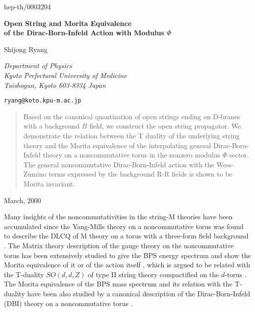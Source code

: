 \documentclass[12pt,a4paper]{article}
\begin{document}
\begin{flushright}
hep-th/0003204
\end{flushright}
\vspace{1.8cm}

\begin{center}
\textbf{\Large Open String and Morita Equivalence \\
of the Dirac-Born-Infeld Action with Modulus $\Phi$}
\end{center}
\vspace{1.6cm}
\begin{center}
 Shijong Ryang
\end{center}

\begin{center}
\textit{Department of Physics \\ Kyoto Prefectural University of Medicine
\\ Taishogun, Kyoto 603-8334 Japan}
\par
\texttt{ryang@koto.kpu-m.ac.jp}
\end{center}
\vspace{2.8cm}
\begin{abstract}
Based on the canonical quantization of open strings ending on D-branes
with a background $B$ field, we construct the open string propagator.
We demonstrate the relation between the T duality of the
underlying string theory and the Morita equivalence of the 
interpolating general Dirac-Born-Infeld theory on a noncommutative torus
in the nonzero modulus $\Phi$ sector. The general noncommutative 
Dirac-Born-Infeld action with the Wess-Zumino terms expressed by the 
background R-R fields is shown to be Morita invariant.
\end{abstract}
\vspace{3cm}
\begin{flushleft}
March, 2000
\end{flushleft}
\newpage
Many insights of the noncommutativities in the string-M theories have 
been accumulated since the Yang-Mills theory on a noncommutative torus was
found to describe the DLCQ of M theory on a torus with a three-form field
background  \cite{CDS}. The Matrix theory description of the gauge 
theory on the noncommutative torus has been extensively studied 
\cite{NCY} to give the BPS energy spectrum and show the Morita 
equivalence of it \cite{PH,BM,KS} or of the action itself \cite{AS,BMZ},
which is argued to be related with the T-duality $SO(d,d,Z)$ of type II 
string theory compactified on the $d$-torus \cite{BMZ,PS}. The Morita 
equivalence of the BPS mass spectrum and its relation with the T-duality
have been also studied by a canonical description of the Dirac-Born-Infeld
(DBI) theory on a noncommutative torus \cite{HV}. 
\end{document}
